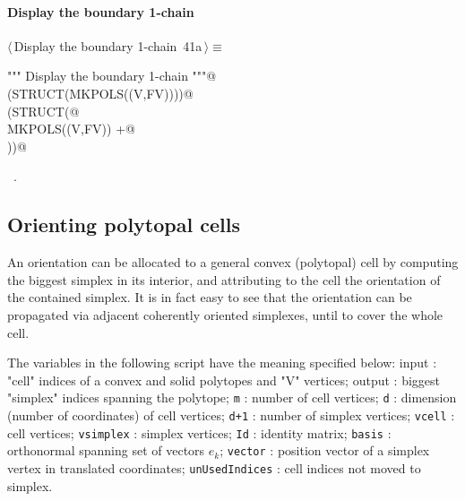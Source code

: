\documentclass[11pt,oneside]{article}	%
\begin{document}
\paragraph{Display the boundary 1-chain}
\begin{flushleft} \small \label{scrap67}
\protect{}$\langle\,$Display the boundary 1-chain\nobreak\ {\footnotesize 41a}$\,\rangle\equiv$
\vspace{-1ex}
\begin{list}{}{} \item
\mbox{}\verb@""" Display the boundary 1-chain """@\\
\mbox{}\verb@VIEW(STRUCT(MKPOLS((V,FV))))@\\
\mbox{}\verb@VIEW(STRUCT(@\\
\mbox{}\verb@   MKPOLS((V,FV)) +@\\
\mbox{}  ))@\\
\mbox{}\verb@@{\NWsep}
\end{list}
\vspace{-1ex}
\footnotesize\addtolength{\baselineskip}{-1ex}
\begin{list}{}{\setlength{\itemsep}{-\parsep}\setlength{\itemindent}{-\leftmargin}}
\item \NWtxtMacroRefIn\ .
\end{list}
\end{flushleft}



\subsection{Orienting polytopal cells}

An orientation can be allocated to a general convex (polytopal) cell by computing the biggest simplex in its interior, and attributing to the cell the orientation of the contained simplex. 
It is in fact easy to see that the orientation can be propagated via adjacent coherently oriented simplexes, until to cover the whole cell.

The variables in the following script have the meaning specified below:
{input} :  "cell" indices of a convex and solid polytopes and "V" vertices;
{output} :  biggest "simplex" indices spanning the polytope;
{\tt m} : number of cell vertices;
{\tt d} : dimension (number of coordinates) of cell vertices;
{\tt d+1} : number of simplex vertices;
{\tt vcell} : cell vertices;
{\tt vsimplex} : simplex vertices;
{\tt Id} : identity matrix;
{\tt basis} : orthonormal spanning set of vectors $e_k$;
{\tt vector} : position vector of a simplex vertex in translated coordinates;
{\tt unUsedIndices} : cell indices not moved to simplex.
\end{document}
